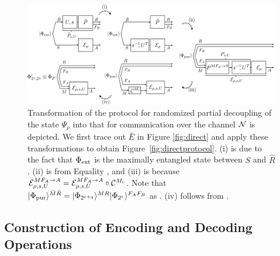 \documentclass[journal]{IEEEtran}
\begin{document}
\begin{figure}[t]
\begin{center}
\includegraphics[bb={0 40 1641 661}, scale=0.3]{figure17.pdf}
\end{center}
\caption{
Transformation of the protocol for randomized partial decoupling of the state $\Psi_\rho$ into that for communication over the channel ${\mathcal N}$ is depicted. We first trace out $\bar{E}$ in Figure \ref{fig:direct} and apply these transformations to obtain Figure~\ref{fig:directprotocol}.
(i) is due to the fact that $\Phi_{\rm ext}$ is the maximally entangled state between $S$ and $\hat{R}$. 
(ii) is from Equality , and (iii) is because ${\mathcal E}_{\rho,s,U}^{MF_A\rightarrow A}={\mathcal E}_{\rho,s,U}^{MF_A\rightarrow A}\circ{\mathcal C}^{M_c}$.
Note that $|\Phi_{\rm pur}\rangle^{\bar{M}\bar{R}}=|\Phi_{2^{c+q}}\rangle^{MR}|\Phi_{2^e}\rangle^{F_AF_B}$ as .
(iv) follows from .
}
\label{fig:directtransform}
\end{figure}




\subsection{Construction of Encoding and Decoding Operations}
\end{document}

